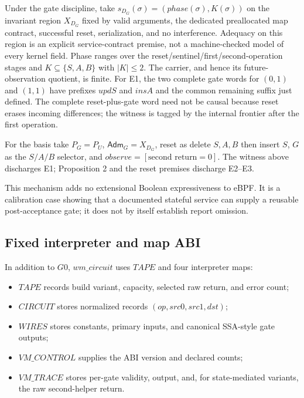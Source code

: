 \documentclass[conference]{IEEEtran}
\begin{document}
Under the gate discipline, take $s_{D_G}(\sigma)=(\mathit{phase}(\sigma),K(\sigma))$ on the invariant region $X_{D_G}$ fixed by valid arguments, the dedicated preallocated map contract, successful reset, serialization, and no interference. Adequacy on this region is an explicit service-contract premise, not a machine-checked model of every kernel field. Phase ranges over the reset/sentinel/first/second-operation stages and $K\subseteq\{S,A,B\}$ with $|K|\le2$. The carrier, and hence its future-observation quotient, is finite. For E1, the two complete gate words for $(0,1)$ and $(1,1)$ have prefixes $\mathit{updS}$ and $\mathit{insA}$ and the common remaining suffix just defined. The complete reset-plus-gate word need not be causal because reset erases incoming differences; the witness is tagged by the internal frontier after the first operation.

For the basis take $P_G=P_U$, $\mathsf{Adm}_G=X_{D_G}$, reset as delete $S,A,B$ then insert $S$, $G$ as the $S/A/B$ selector, and $\mathit{observe}=[\text{second return}=0]$. The witness above discharges E1; Proposition 2 and the reset premises discharge E2--E3.

This mechanism adds no extensional Boolean expressiveness to eBPF. It is a calibration case showing that a documented stateful service can supply a reusable post-acceptance gate; it does not by itself establish report omission.

\subsection{Fixed interpreter and map ABI}

In addition to $G0$, $\mathit{wm\_circuit}$ uses $\mathit{TAPE}$ and four interpreter maps:

\begin{itemize}
\item $\mathit{TAPE}$ records build variant, capacity, selected raw return, and error count;
\item $\mathit{CIRCUIT}$ stores normalized records $(\mathit{op},\mathit{src0},\mathit{src1},\mathit{dst})$;
\item $\mathit{WIRES}$ stores constants, primary inputs, and canonical SSA-style gate outputs;
\item $\mathit{VM\_CONTROL}$ supplies the ABI version and declared counts;
\item $\mathit{VM\_TRACE}$ stores per-gate validity, output, and, for state-mediated variants, the raw second-helper return.
\end{itemize}
\end{document}

